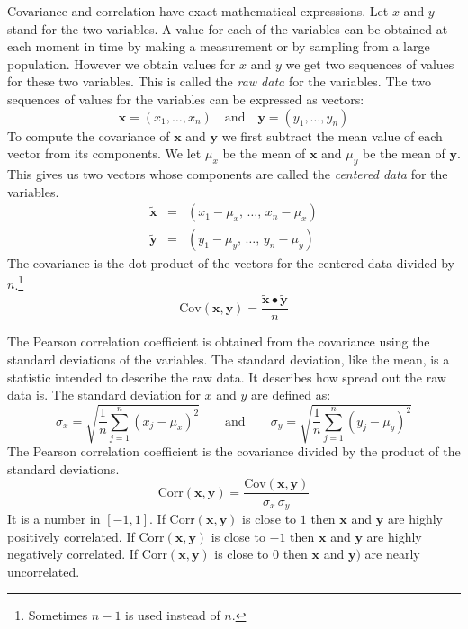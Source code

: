    Covariance and correlation have exact mathematical expressions.  Let $x$ and 
$y$ stand for the two variables.  A value for each of the variables can be 
obtained at each moment in time by making a measurement or by sampling from a 
large population.  However we obtain values for $x$ and $y$ we get two 
sequences of values for these two variables.  This is called the 
\emph{raw data} for the variables.  The two sequences of values for the 
variables can be expressed as vectors:
\begin{equation}
\mathbf{x} = (x_1, \dots, x_n) \quad \mbox{and} \quad 
\mathbf{y} = (y_1, \dots, y_n)
\end{equation}
To compute the covariance of $\mathbf{x}$ and $\mathbf{y}$ we first subtract 
the mean value of each vector from its components.  We let $\mu_x$ be the 
mean of $\mathbf{x}$ and $\mu_y$ be the mean of $\mathbf{y}$.  This gives 
us two vectors whose components are called the \emph{centered data} for the 
variables.
\begin{eqnarray}
\widetilde{\mathbf{x}} &=& (x_1 - \mu_x, \, \dots, \, x_n - \mu_x) 
                                                             \nonumber \\[1mm]
\widetilde{\mathbf{y}} &=& (y_1 - \mu_y, \, \dots, \, y_n - \mu_y) 
\end{eqnarray}
The covariance is the dot product of the vectors for the centered data divided 
by $n$.\footnote{Sometimes $n-1$ is used instead of $n$.}
\begin{equation}\label{E:covdef}
\mathrm{Cov}(\mathbf{x}, \mathbf{y}) = \frac{\widetilde{\mathbf{x}} \bullet 
                                             \widetilde{\mathbf{y}}}{n} 
\end{equation}

   The Pearson correlation coefficient is obtained from the covariance using
the standard deviations of the variables.  The standard deviation, like the 
mean, is a statistic intended to describe the raw data.  It describes how 
spread out the raw data is.  The standard deviation for $x$ and $y$ are defined
as:
\begin{equation}
    \sigma_x = \sqrt{ \frac{1}{n} \sum_{j=1}^n (x_j - \mu_x)^2} 
\qquad \mbox{and} \qquad 
    \sigma_y = \sqrt{ \frac{1}{n} \sum_{j=1}^n (y_j - \mu_y)^2}
\end{equation}
The Pearson correlation coefficient is the covariance divided by the product of
the standard deviations.
\begin{equation}\label{E:corrdef}
\mathrm{Corr}(\mathbf{x}, \mathbf{y}) = 
\frac{\mathrm{Cov}(\mathbf{x}, \mathbf{y})}{\sigma_x \, \sigma_y}
\end{equation}
It is a number in $[-1,1]$.  If $\mathrm{Corr}(\mathbf{x}, \mathbf{y})$ is 
close to $1$ then $\mathbf{x}$ and $\mathbf{y}$ are highly positively 
correlated.  If $\mathrm{Corr}(\mathbf{x}, \mathbf{y})$ is close to $-1$ then 
$\mathbf{x}$ and $\mathbf{y}$ are highly negatively correlated.  If 
$\mathrm{Corr}(\mathbf{x}, \mathbf{y})$ is close to $0$ then $\mathbf{x}$ and 
$\mathbf{y})$ are nearly uncorrelated.  

